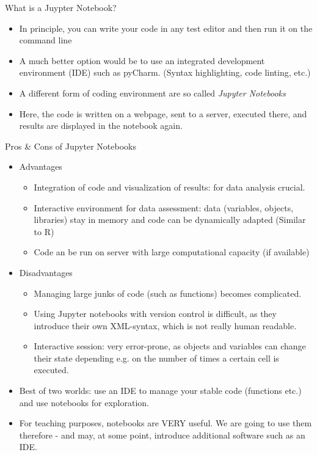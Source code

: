 \begin{frame}{What is a Juypter Notebook?}
	
	\begin{itemize}
		\item In principle, you can write your code in any test editor and then run it on the command line
		\item A much better option would be to use an integrated development environment (IDE) such as pyCharm. (Syntax highlighting, code linting, etc.)
		\item A different form of coding environment are so called \textit{Jupyter Notebooks}
		\item Here, the code is written on a webpage, sent to a server, executed there, and results are displayed in the notebook again.
	
	\end{itemize}	
	
	
\end{frame}

\begin{frame}{Pros \& Cons of Jupyter Notebooks}

\begin{itemize}
		\item Advantages
	\begin{itemize}
		\item Integration of code and visualization of results: for data analysis crucial. 
		\item Interactive environment for data assessment: data (variables, objects, libraries) stay in memory and code can be dynamically adapted (Similar to R)
		\item Code an be run on server with large computational capacity (if available)
				
	\end{itemize}
	\item Disadvantages
	\begin{itemize}
		\item Managing large junks of code (such as functions) becomes complicated. 
		\item Using Jupyter notebooks with version control is difficult, as they introduce their own XML-syntax, which is not really human readable. 
		\item Interactive session: very error-prone, as objects and variables can change their state depending e.g. on the number of times a certain cell is executed.		
	\end{itemize}

	\item Best of two worlds: use an IDE to manage your stable code (functions etc.) and use notebooks for exploration.
	\item For teaching purposes, notebooks are VERY useful. We are going to use them therefore - and may, at some point, introduce additional software such as an IDE.
\end{itemize}	
	
\end{frame}


